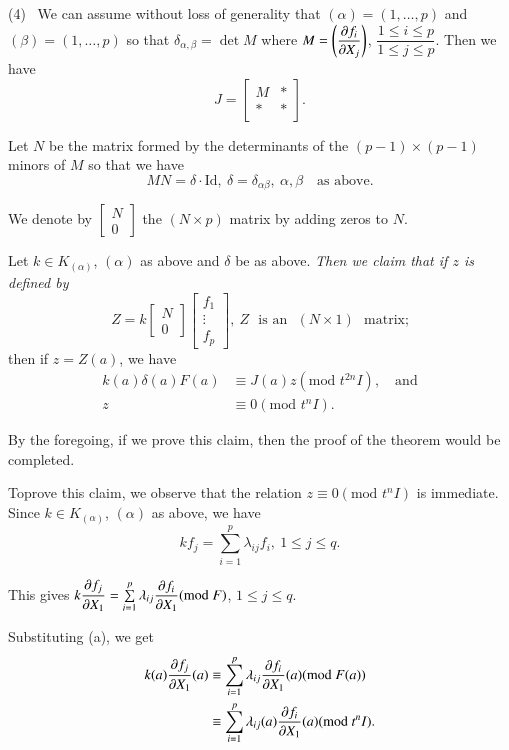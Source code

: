 \smallskip
(4)~ We can assume without loss of generality that
$(\alpha)=(1,\ldots,p)$ and $(\beta)=(1,\ldots,p)$ so that
$\delta_{\alpha,\beta}=\det M$ where $M=\left(\dfrac{\partial f_{i}}{\partial
  X_{j}}\right)$, $\dfrac{1\leq i\leq p}{1\leq j\leq p}$. Then we have
$$
J=
\begin{bmatrix}
M & \ast\\
\ast & \ast
\end{bmatrix}.
$$

Let $N$ be the matrix formed by the determinants of the $(p-1)\times
(p-1)$ minors of $M$ so that we have
$$
MN=\delta\cdot
\text{Id},\ \delta=\delta_{\alpha\beta},\ \alpha,\beta\quad\text{as
  above.}
$$

We denote by $\left[\begin{smallmatrix} N\\ 0\end{smallmatrix}\right]$
the $(N\times p)$ matrix by adding zeros to $N$.

Let $k\in K_{(\alpha)}$, $(\alpha)$ as above and $\delta$ be as
above. {\em Then we claim that if $z$ is defined by}
$$
Z=k
\begin{bmatrix}
N\\
0
\end{bmatrix}
\begin{bmatrix}
f_{1}\\
\vdots\\
f_{p}
\end{bmatrix},\ 
Z\text{~ is an~ }(N\times 1)\text{~ matrix;}
$$
then if $z=Z(a)$, we have
\begin{align*}
k(a)\delta(a)F(a) &\equiv J(a)z(\text{mod~}t^{2n}I),\quad\text{and}\\
z &\equiv 0(\text{mod~}t^{n}I).
\end{align*}

By the foregoing, if we prove this claim, then the proof of the
theorem would be completed.

To\pageoriginale prove this claim, we observe that the relation
$z\equiv 0(\text{mod~}t^{n}I)$ is immediate. Since $k\in
K_{(\alpha)}$, $(\alpha)$ as above, we have
\begin{equation*}
kf_{j}=\sum^{p}_{i=1}\lambda_{ij}f_{i},\ 1\leq j\leq q.\tag{I}
\end{equation*}

This gives $k\dfrac{\partial f_{j}}{\partial
  X_{1}}=\sum\limits^{p}_{i=1}\lambda_{ij}\dfrac{\partial f_{i}}{\partial
  X_{1}}(\text{mod~}F)$, $1\leq j\leq q$.

Substituting (a), we get
\begin{align*}
k(a)\frac{\partial f_{j}}{\partial X_{1}}(a) &\equiv
\sum^{p}_{i=1}\lambda_{ij}\frac{\partial f_{i}}{\partial
  X_{1}}(a)(\text{mod~}F(a))\\
&\equiv \sum^{p}_{i=1}\lambda_{ij}(a)\frac{\partial f_{i}}{\partial
  X_{1}}(a)(\text{mod~}t^{n}I). 
\end{align*}

